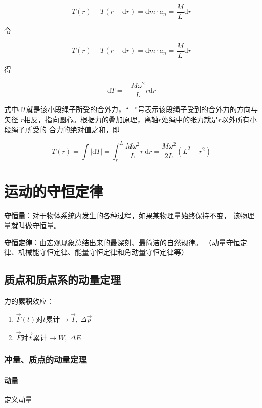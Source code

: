 \documentclass[
	12pt, %
	a4paper, %
]{myLegrandOrangeBook}
\newcommand{\rmd}{\mathrm{d}}
\begin{document}
    $$
        T(r)-T(r+\rmd r)=\rmd m \cdot a_n=\frac{M}{L} \rmd r
    $$

    令

    $$
        T(r)-T(r+\rmd r)=\rmd m \cdot a_n=\frac{M}{L} \rmd r
    $$

    得

    $$
        \rmd T=-\frac{M \omega^2}{L} r \rmd r
    $$

    式中\(\rmd T\)就是该小段绳子所受的合外力，“\(-\)”号表示该段绳子受到的合外力的方向与矢径
    \(r\)相反，指向圆心。根据力的叠加原理，离轴\(r\)处绳中的张力就是\(r\)以外所有小段绳子所受的
    合力的绝对值之和，即

    $$
        T(r)=\int|\mathrm{d} T|=\int_r^L \frac{M \omega^2}{L} r \mathrm{~d} r=\frac{M \omega^2}{2 L}\left(L^2-r^2\right)
    $$

\chapter{运动的守恒定律}

\textbf{守恒量}：对于物体系统内发生的各种过程，如果某物理量始终保持不变，
该物理量就叫做守恒量。

\textbf{守恒定律}：由宏观现象总结出来的最深刻、最简洁的自然规律。
（动量守恒定律、机械能守恒定律、能量守恒定律和角动量守恒定律等）

\section{质点和质点系的动量定理}

力的\textbf{累积}效应：

\begin{enumerate}
    \item \(\overrightarrow{F}\left(t\right)\)对\(t\)累计\(\rightarrow \overrightarrow{I},\; \Delta \overrightarrow{p}\)
    \item \(\overrightarrow{F}\)对\(\overrightarrow{t}\)累计\(\rightarrow W,\; \Delta E\)
\end{enumerate}

\subsection{冲量、质点的动量定理}

\subsubsection*{动量}

定义动量
\end{document}
